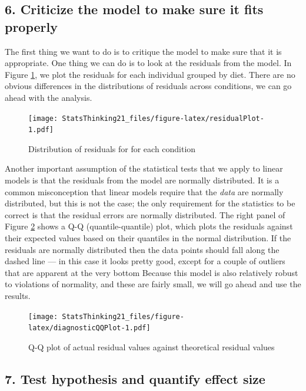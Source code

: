 \documentclass[
  12pt,
]{book}
\begin{document}
\hypertarget{criticize-the-model-to-make-sure-it-fits-properly}{%
\subsection{6. Criticize the model to make sure it fits properly}\label{criticize-the-model-to-make-sure-it-fits-properly}}

The first thing we want to do is to critique the model to make sure that it is appropriate. One thing we can do is to look at the residuals from the model. In Figure \ref{fig:residualPlot}, we plot the residuals for each individual grouped by diet. There are no obvious differences in the distributions of residuals across conditions, we can go ahead with the analysis.

\begin{figure}
\centering
\texttt{[image: StatsThinking21\_files/figure-latex/residualPlot-1.pdf]}
\caption{\label{fig:residualPlot}Distribution of residuals for for each condition}
\end{figure}

Another important assumption of the statistical tests that we apply to linear models is that the residuals from the model are normally distributed. It is a common misconception that linear models require that the \emph{data} are normally distributed, but this is not the case; the only requirement for the statistics to be correct is that the residual errors are normally distributed. The right panel of Figure \ref{fig:diagnosticQQPlot} shows a Q-Q (quantile-quantile) plot, which plots the residuals against their expected values based on their quantiles in the normal distribution. If the residuals are normally distributed then the data points should fall along the dashed line --- in this case it looks pretty good, except for a couple of outliers that are apparent at the very bottom Because this model is also relatively robust to violations of normality, and these are fairly small, we will go ahead and use the results.

\begin{figure}
\centering
\texttt{[image: StatsThinking21\_files/figure-latex/diagnosticQQPlot-1.pdf]}
\caption{\label{fig:diagnosticQQPlot}Q-Q plot of actual residual values against theoretical residual values}
\end{figure}

\hypertarget{test-hypothesis-and-quantify-effect-size}{%
\subsection{7. Test hypothesis and quantify effect size}\label{test-hypothesis-and-quantify-effect-size}}
\end{document}
